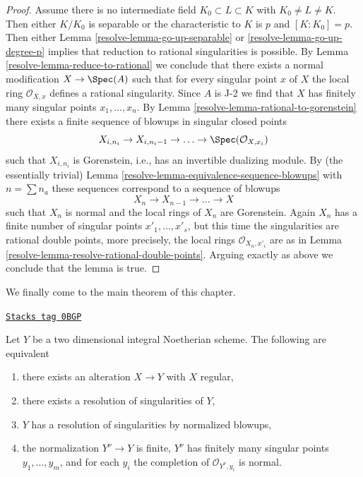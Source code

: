 \begin{proof}
\medskip\noindent
Assume there is no intermediate field $K_0 \subset L \subset K$
with $K_0 \not = L \not = K$. Then either $K/K_0$ is separable
or the characteristic to $K$ is $p$ and $[K : K_0] = p$.
Then either Lemma \ref{resolve-lemma-go-up-separable} or \ref{resolve-lemma-go-up-degree-p}
implies that reduction to rational singularities is possible.
By Lemma \ref{resolve-lemma-reduce-to-rational} we conclude that there exists a
normal modification $X \to \Spec(A)$ such that for
every singular point $x$ of $X$ the local ring $\mathcal{O}_{X, x}$
defines a rational singularity. Since $A$ is J-2 we find that $X$ has
finitely many singular points $x_1, \ldots, x_n$.
By Lemma \ref{resolve-lemma-rational-to-gorenstein}
there exists a finite sequence of blowups in singular closed points
$$
X_{i, n_i} \to X_{i, n_i - 1} \to \ldots \to \Spec(\mathcal{O}_{X, x_i})
$$
such that $X_{i, n_i}$ is Gorenstein, i.e., has an
invertible dualizing module. By (the essentially trivial)
Lemma \ref{resolve-lemma-equivalence-sequence-blowups}
with $n = \sum n_a$ these sequences correspond to a sequence of
blowups
$$
X_n \to X_{n - 1} \to \ldots \to X
$$
such that $X_n$ is normal and the local rings of $X_n$ are Gorenstein.
Again $X_n$ has a finite number of singular points
$x'_1, \ldots, x'_s$, but this time the singularities are
rational double points, more precisely, the local rings
$\mathcal{O}_{X_n, x'_i}$ are as in
Lemma \ref{resolve-lemma-resolve-rational-double-points}.
Arguing exactly as above we conclude that the lemma is true.
\end{proof}

We finally come to the main theorem of this chapter.

\begin{theorem}[Lipman]

\label{resolve-theorem-resolve}
\href{https://stacks.math.columbia.edu/tag/0BGP}{\texttt{Stacks tag 0BGP}}

\begin{reference}
\cite[Theorem on page 151]{Lipman}
\end{reference}
Let $Y$ be a two dimensional integral Noetherian scheme. The following are
equivalent
\begin{enumerate}
\item there exists an alteration $X \to Y$ with $X$ regular,
\item there exists a resolution of singularities of $Y$,
\item $Y$ has a resolution of singularities by normalized blowups,
\item the normalization $Y^\nu \to Y$ is finite, $Y^\nu$ has
finitely many singular points $y_1, \ldots, y_m$, and for each
$y_i$ the completion of $\mathcal{O}_{Y^\nu, y_i}$ is normal.
\end{enumerate}
\end{theorem}

